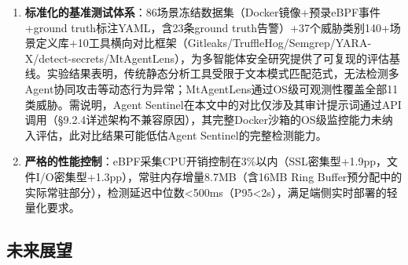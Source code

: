 \documentclass[a4paper]{ctexart}
\makeatletter
\renewcommand{\_}{%
  \ifmmode
    \nfss@text{\textunderscore}%
  \else
    \textunderscore\discretionary{}{}{}%
  \fi}
\makeatother
\begin{document}
\begin{enumerate}
\item \textbf{标准化的基准测试体系}：86场景冻结数据集（Docker镜像+预录eBPF事件+ground truth标注YAML，含23条ground truth告警）+37个威胁类别140+场景定义库+10工具横向对比框架（Gitleaks/TruffleHog/Semgrep/YARA-X/detect-secrets/MtAgentLens），为多智能体安全研究提供了可复现的评估基线。实验结果表明，传统静态分析工具受限于文本模式匹配范式，无法检测多Agent协同攻击等动态行为异常；MtAgentLens通过OS级可观测性覆盖全部11类威胁。需说明，Agent Sentinel在本文中的对比仅涉及其审计提示词通过API调用（§9.2.4详述架构不兼容原因），其完整Docker沙箱的OS级监控能力未纳入评估，此对比结果可能低估Agent Sentinel的完整检测能力。

\item \textbf{严格的性能控制}：eBPF采集CPU开销控制在3\%以内（SSL密集型+1.9pp，文件I/O密集型+1.3pp），常驻内存增量8.7MB（含16MB Ring Buffer预分配中的实际常驻部分），检测延迟中位数<500ms（P95<2s），满足端侧实时部署的轻量化要求。
\end{enumerate}

\subsection{未来展望}
\end{document}
